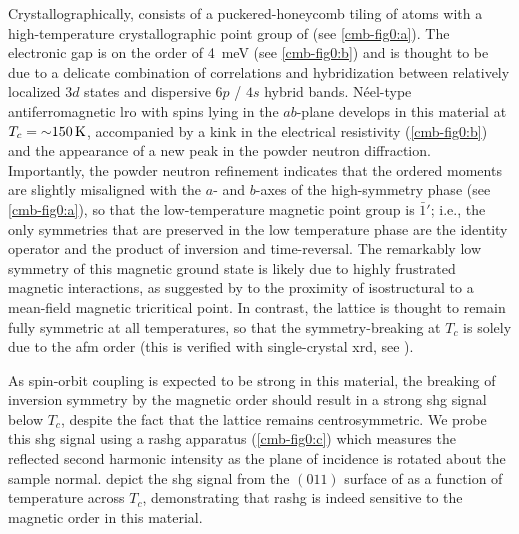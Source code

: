 Crystallographically, \cmb consists of a puckered-honeycomb tiling of  atoms with a high-temperature crystallographic point group of \htpg (see \cref{cmb-fig0:a}).
The electronic gap is on the order of \qty{4}{meV} (see \cref{cmb-fig0:b}) and is thought to be due to a delicate combination of correlations and hybridization between relatively localized  $3d$ states and dispersive  $6p$ /  $4s$ hybrid bands\citep{gibson_magnetic_2015, piva_putative_2019, lane_competition_2019}.
N\'{e}el-type antiferromagnetic \gls{lro} with spins lying in the $ab$-plane develops in this material at $T_c={\sim}\qty{150}{K}$, accompanied by a kink in the electrical resistivity (\cref{cmb-fig0:b}) and the appearance of a new peak in the powder neutron diffraction\citep{gibson_magnetic_2015}.
Importantly, the powder neutron refinement indicates that the ordered moments are slightly misaligned with the $a$- and $b$-axes of the high-symmetry phase (see \cref{cmb-fig0:a}), so that the low-temperature magnetic point group is $\bar{1}'$; i.e., the only symmetries that are preserved in the low temperature phase are the identity operator and the product of inversion and time-reversal\citep{gibson_magnetic_2015}.
The remarkably low symmetry of this magnetic ground state is likely due to highly frustrated magnetic interactions, as suggested by to the proximity of isostructural  to a mean-field magnetic tricritical point\citep{mazin_camn2sb2_2013,mcnally_camn2sb2_2015}.
In contrast, the lattice is thought to remain fully symmetric at all temperatures, so that the symmetry-breaking at $T_c$ is solely due to the \gls{afm} order (this is verified with single-crystal \gls{xrd}, see ).

As spin-orbit coupling is expected to be strong in this material, the breaking of inversion symmetry by the magnetic order should result in a strong \gls{shg} signal below $T_c$, despite the fact that the lattice remains centrosymmetric\citep{pan_optical_1989,seyler_spin-orbit-enhanced_2020}.
We probe this \gls{shg} signal using a \gls{rashg} apparatus (\cref{cmb-fig0:c}) which measures the reflected second harmonic intensity as the plane of incidence is rotated about the sample normal\citep{fichera_second_2020, harter_high-speed_2015, torchinsky_low_2014}.
 depict the \gls{shg} signal from the $(011)$ surface of \cmb as a function of temperature across $T_c$, demonstrating that \gls{rashg} is indeed sensitive to the magnetic order in this material.

